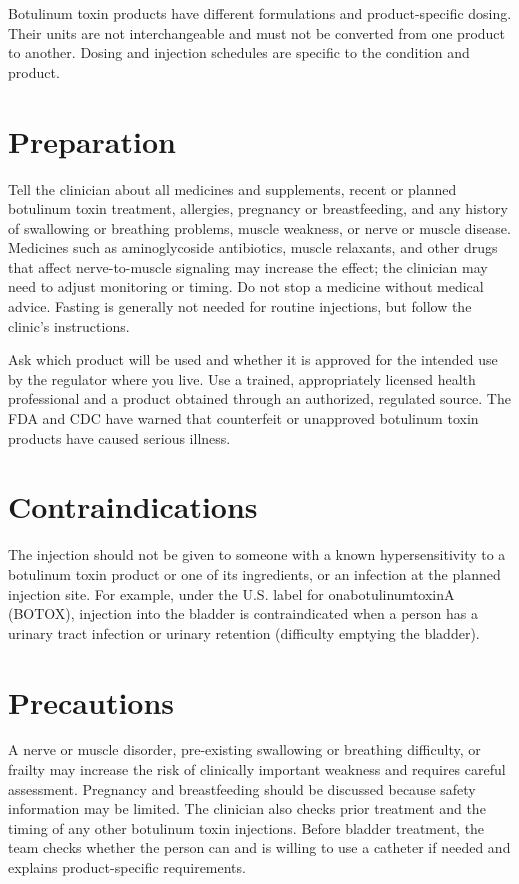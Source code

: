 Botulinum toxin products have different formulations and product-specific dosing. Their units are not interchangeable and must not be converted from one product to another. Dosing and injection schedules are specific to the condition and product.

\section*{Preparation}
Tell the clinician about all medicines and supplements, recent or planned botulinum toxin treatment, allergies, pregnancy or breastfeeding, and any history of swallowing or breathing problems, muscle weakness, or nerve or muscle disease. Medicines such as aminoglycoside antibiotics, muscle relaxants, and other drugs that affect nerve-to-muscle signaling may increase the effect; the clinician may need to adjust monitoring or timing. Do not stop a medicine without medical advice. Fasting is generally not needed for routine injections, but follow the clinic's instructions.

Ask which product will be used and whether it is approved for the intended use by the regulator where you live. Use a trained, appropriately licensed health professional and a product obtained through an authorized, regulated source. The FDA and CDC have warned that counterfeit or unapproved botulinum toxin products have caused serious illness.

\section*{Contraindications}
The injection should not be given to someone with a known hypersensitivity to a botulinum toxin product or one of its ingredients, or an infection at the planned injection site. For example, under the U.S. label for onabotulinumtoxinA (BOTOX), injection into the bladder is contraindicated when a person has a urinary tract infection or urinary retention (difficulty emptying the bladder).

\section*{Precautions}
A nerve or muscle disorder, pre-existing swallowing or breathing difficulty, or frailty may increase the risk of clinically important weakness and requires careful assessment. Pregnancy and breastfeeding should be discussed because safety information may be limited. The clinician also checks prior treatment and the timing of any other botulinum toxin injections. Before bladder treatment, the team checks whether the person can and is willing to use a catheter if needed and explains product-specific requirements.

